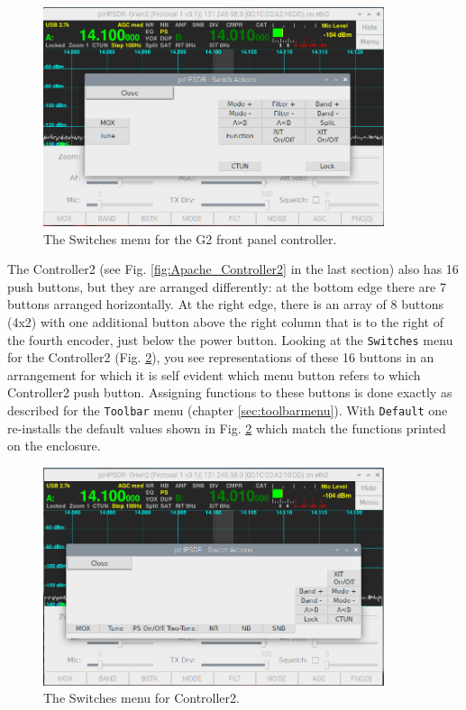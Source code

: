 \documentclass[12pt]{book}
\def\rett#1{\texttt{\color{red}#1}}
\def\bltt#1{\texttt{\color{blue}#1}}
\begin{document}
\begin{figure}[ht]
\center
\includegraphics[width=10cm]{SwitchMenuG2.png}
\caption{The Switches menu for the G2 front panel controller.}
\label{fig:SwitchMenuG2}
\end{figure}

The Controller2 (see Fig. \ref{fig:Apache_Controller2} in the last section)
also has 16 push buttons, but they are arranged differently:
at the bottom edge there are 7 buttons arranged horizontally. At the right
edge, there is an array of 8 buttons (4x2) with one additional button
above the right column that is to the right of the fourth encoder, just
below the power button. Looking at the \bltt{Switches} menu for the
Controller2 (Fig. \ref{fig:SwitchMenuV2}), you see representations of
these 16 buttons in an arrangement for which it is self evident which
menu button refers to which Controller2 push button.
Assigning functions
to these buttons is done exactly as described for the \bltt{Toolbar} menu
(chapter \ref{sec:toolbarmenu}).
With \rett{Default} one re-installs the default values
shown in Fig. \ref{fig:SwitchMenuV2} which match the functions printed on the enclosure.

\begin{figure}[ht]
\center
\includegraphics[width=10cm]{SwitchMenuV2.png}
\caption{The Switches menu for Controller2.}
\label{fig:SwitchMenuV2}
\end{figure}
\end{document}
